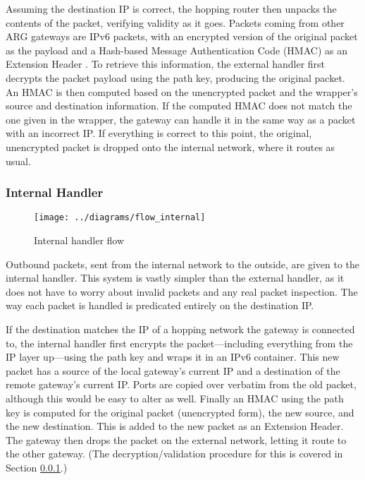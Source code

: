 \par Assuming the destination IP is correct, the hopping router then unpacks the contents of the packet, verifying validity as it goes. Packets coming from other ARG gateways are IPv6 packets, with an encrypted version of the original packet as the payload and a Hash-based Message Authentication Code (HMAC) as an Extension Header \cite{rfc2460}. To retrieve this information, the external handler first decrypts the packet payload using the path key, producing the original packet. An HMAC is then computed based on the unencrypted packet and the wrapper's source and destination information. If the computed HMAC does not match the one given in the wrapper, the gateway can handle it in the same way as a packet with an incorrect IP. If everything is correct to this point, the original, unencrypted packet is dropped onto the internal network, where it routes as usual.

\subsubsection{Internal Handler}
\label{sec:internal_handler}

\begin{figure}
	\centering
	\texttt{[image: ../diagrams/flow\_internal]}
	\caption{Internal handler flow}
	\label{fig:flow_internal}
\end{figure}

\par Outbound packets, sent from the internal network to the outside, are given to the internal handler. This system is vastly simpler than the external handler, as it does not have to worry about invalid packets and any real packet inspection. The way each packet is handled is predicated entirely on the destination IP.

\par If the destination matches the IP of a hopping network the gateway is connected to, the internal handler first encrypts the packet---including everything from the IP layer up---using the path key and wraps it in an IPv6 container. This new packet has a source of the local gateway's current IP and a destination of the remote gateway's current IP. Ports are copied over verbatim from the old packet, although this would be easy to alter as well. Finally an HMAC using the path key is computed for the original packet (unencrypted form), the new source, and the new destination. This is added to the new packet as an Extension Header. The gateway then drops the packet on the external network, letting it route to the other gateway. (The decryption/validation procedure for this is covered in Section \ref{sec:internal_handler}.)

